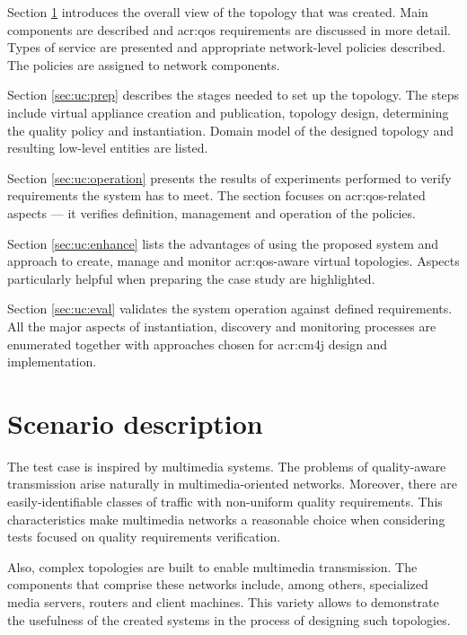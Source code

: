 \documentclass[11pt,openany]{book}
\begin{document}
    Section \ref{sec:uc:description} introduces the overall view of the topology that was created. Main components are
    described and \gls{acr:qos} requirements are discussed in more detail. Types of service are presented and
    appropriate network-level policies described. The policies are assigned to network components.

    Section \ref{sec:uc:prep} describes the stages needed to set up the topology. The steps include virtual appliance
    creation and publication, topology design, determining the quality policy and instantiation. Domain model of the
    designed topology and resulting low-level entities are listed.

    Section \ref{sec:uc:operation} presents the results of experiments performed to verify requirements the system has
    to meet. The section focuses on \gls{acr:qos}-related aspects --- it verifies definition, management and operation
    of the policies.

    Section \ref{sec:uc:enhance} lists the advantages of using the proposed system and approach to create, manage and
    monitor \gls{acr:qos}-aware virtual topologies. Aspects particularly helpful when preparing the case study are
    highlighted.

    Section \ref{sec:uc:eval} validates the system operation against defined requirements. All the major aspects of
    instantiation, discovery and monitoring processes are enumerated together with approaches chosen for \gls{acr:cm4j}
    design and implementation.


    \section{Scenario description}
    \label{sec:uc:description}

      The test case is inspired by multimedia systems. The problems of quality-aware transmission arise naturally in
      multimedia-oriented networks. Moreover, there are easily-identifiable classes of traffic with non-uniform quality
      requirements. This characteristics make multimedia networks a reasonable choice when considering tests focused on
      quality requirements verification.
      
      Also, complex topologies are built to enable multimedia transmission. The components that comprise these networks
      include, among others, specialized media servers, routers and client machines. This variety allows to demonstrate
      the usefulness of the created systems in the process of designing such topologies.
\end{document}
